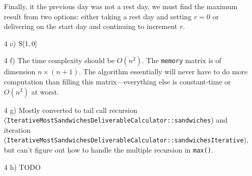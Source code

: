 \documentclass[]{article}
\begin{document}
\begin{itemize}
	Finally, it the previous day was not a rest day, we must find the maximum result from two options: either taking a rest day and setting $r=0$ or delivering on the start day and continuing to increment $r$.
	
	\item [4 c)] $\textsc{S}[1, 0]$
	
	\item [4 f)] The time complexity should be $O(n^2)$. The \texttt{memory} matrix is of dimension $n \times (n+1)$. The algorithm essentially will never have to do more computation than filling this matrix---everything else is constant-time or $O(n^2)$ at worst.
	
	\item [4 g)] Mostly converted to tail call recursion (\texttt{IterativeMostSandwichesDeliverableCalculator::sandwiches}) and iteration (\texttt{IterativeMostSandwichesDeliverableCalculator::sandwichesIterative}), but can't figure out how to handle the multiple recursion in \texttt{max()}.
	
	\item [4 h)] TODO
	
\end{itemize}
\end{document}
